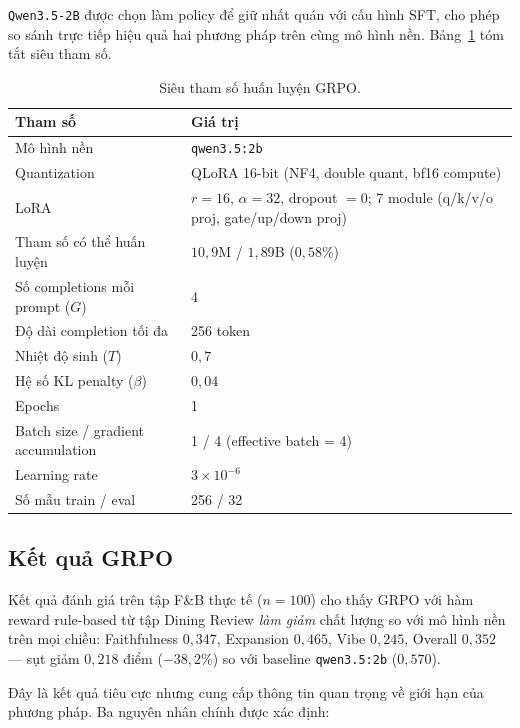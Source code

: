 \texttt{Qwen3.5-2B} được chọn làm policy để giữ nhất quán với cấu
hình SFT, cho phép so sánh trực tiếp hiệu quả hai phương pháp trên
cùng mô hình nền. Bảng~\ref{tab:grpo-config} tóm tắt siêu tham số.

\begin{table}[htbp]
  \centering
  \small
  \caption{Siêu tham số huấn luyện GRPO.}
  \label{tab:grpo-config}
  \begin{tabular}{p{}p{}}
    \toprule
    \textbf{Tham số} & \textbf{Giá trị} \\
    \midrule
    Mô hình nền & \texttt{qwen3.5:2b} \\
    Quantization & QLoRA 16-bit (NF4, double quant,
                   bf16 compute) \\
    LoRA & $r=16$, $\alpha=32$, dropout $=0$;
           7 module (q/k/v/o proj,
           gate/up/down proj) \\
    Tham số có thể huấn luyện &
      $10{,}9$M / $1{,}89$B ($0{,}58\%$) \\
    \midrule
    Số completions mỗi prompt ($G$) & 4 \\
    Độ dài completion tối đa & 256 token \\
    Nhiệt độ sinh ($T$) & $0{,}7$ \\
    Hệ số KL penalty ($\beta$) & $0{,}04$ \\
    \midrule
    Epochs & 1 \\
    Batch size / gradient accumulation &
      1 / 4 (effective batch = 4) \\
    Learning rate & $3 \times 10^{-6}$ \\
    Số mẫu train / eval & 256 / 32 \\
    \bottomrule
  \end{tabular}
\end{table}

\subsection{Kết quả GRPO}

Kết quả đánh giá trên tập F\&B thực tế ($n = 100$) cho thấy GRPO với
hàm reward rule-based từ tập Dining Review \emph{làm giảm} chất lượng
so với mô hình nền trên mọi chiều: Faithfulness $0{,}347$, Expansion
$0{,}465$, Vibe $0{,}245$, Overall $0{,}352$ --- sụt giảm $0{,}218$
điểm ($-38{,}2\%$) so với baseline \texttt{qwen3.5:2b} ($0{,}570$).

Đây là kết quả tiêu cực nhưng cung cấp thông tin quan trọng về giới
hạn của phương pháp. Ba nguyên nhân chính được xác định:

